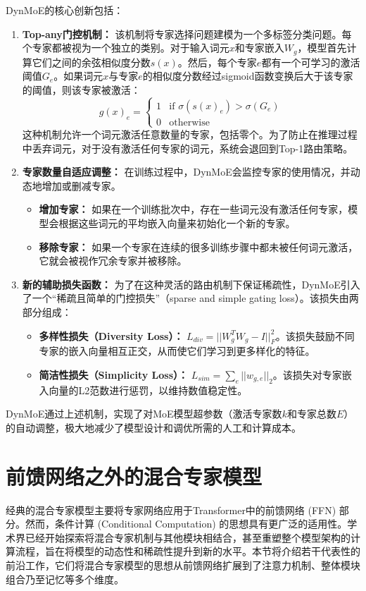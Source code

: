 DynMoE的核心创新包括：
\begin{enumerate}
    \item \textbf{Top-any门控机制：} 该机制将专家选择问题建模为一个多标签分类问题。每个专家都被视为一个独立的类别。对于输入词元$x$和专家嵌入$W_g$，模型首先计算它们之间的余弦相似度分数$s(x)$。然后，每个专家$e$都有一个可学习的激活阈值$G_e$。如果词元$x$与专家$e$的相似度分数经过sigmoid函数变换后大于该专家的阈值，则该专家被激活：
    \begin{equation}
        g(x)_e = 
        \begin{cases}
            1 & \text{if } \sigma(s(x)_e) > \sigma(G_e) \\
            0 & \text{otherwise}
        \end{cases}
    \end{equation}
    这种机制允许一个词元激活任意数量的专家，包括零个。为了防止在推理过程中丢弃词元，对于没有激活任何专家的词元，系统会退回到Top-1路由策略。

    \item \textbf{专家数量自适应调整：} 在训练过程中，DynMoE会监控专家的使用情况，并动态地增加或删减专家。
    \begin{itemize}
        \item \textbf{增加专家：} 如果在一个训练批次中，存在一些词元没有激活任何专家，模型会根据这些词元的平均嵌入向量来初始化一个新的专家。
        \item \textbf{移除专家：} 如果一个专家在连续的很多训练步骤中都未被任何词元激活，它就会被视作冗余专家并被移除。
    \end{itemize}
    \item \textbf{新的辅助损失函数：} 为了在这种灵活的路由机制下保证稀疏性，DynMoE引入了一个“稀疏且简单的门控损失”（sparse and simple gating loss）。该损失由两部分组成：
    \begin{itemize}
        \item \textbf{多样性损失（Diversity Loss）：} $L_{div} = ||W_g^T W_g - I||_F^2$。该损失鼓励不同专家的嵌入向量相互正交，从而使它们学习到更多样化的特征。
        \item \textbf{简洁性损失（Simplicity Loss）：} $L_{sim} = \sum_e ||w_{g,e}||_2$。该损失对专家嵌入向量的L2范数进行惩罚，以维持数值稳定性。
    \end{itemize}
\end{enumerate}
DynMoE通过上述机制，实现了对MoE模型超参数（激活专家数$k$和专家总数$E$）的自动调整，极大地减少了模型设计和调优所需的人工和计算成本。

\section{前馈网络之外的混合专家模型}
\label{sec:moe_beyond_ffn}
经典的混合专家模型主要将专家网络应用于Transformer中的前馈网络 (FFN) 部分。然而，条件计算 (Conditional Computation) 的思想具有更广泛的适用性。学术界已经开始探索将混合专家机制与其他模块相结合，甚至重塑整个模型架构的计算流程，旨在将模型的动态性和稀疏性提升到新的水平。本节将介绍若干代表性的前沿工作，它们将混合专家模型的思想从前馈网络扩展到了注意力机制、整体模块组合乃至记忆等多个维度。

